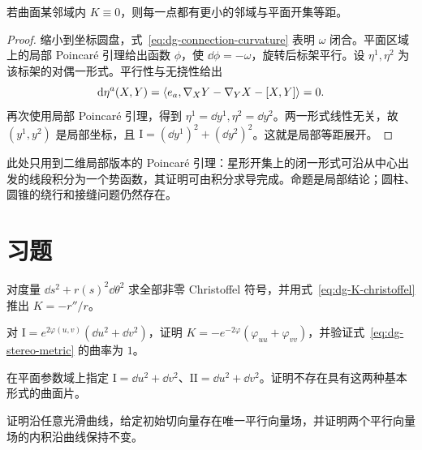 \begin{proposition}[零高斯曲率的局部平面模型]
若曲面某邻域内 $K\equiv0$，则每一点都有更小的邻域与平面开集等距。
\end{proposition}
\begin{proof}
缩小到坐标圆盘，式~\eqref{eq:dg-connection-curvature} 表明 $\omega$ 闭合。平面区域上的局部 Poincar\'e 引理给出函数 $\phi$，使 $\dd\phi=-\omega$，旋转后标架平行。设 $\eta^1,\eta^2$ 为该标架的对偶一形式。平行性与无挠性给出
\[
 \mathop{}\!\mathrm d\eta^a(X,Y)=\langle e_a,\nabla_XY-\nabla_YX-[X,Y]\rangle=0.
\]
再次使用局部 Poincar\'e 引理，得到 $\eta^1=\dd y^1,\eta^2=\dd y^2$。两一形式线性无关，故 $(y^1,y^2)$ 是局部坐标，且 $\mathrm I=(\dd y^1)^2+(\dd y^2)^2$。这就是局部等距展开。
\end{proof}
此处只用到二维局部版本的 Poincar\'e 引理：星形开集上的闭一形式可沿从中心出发的线段积分为一个势函数，其证明可由积分求导完成。命题是局部结论；圆柱、圆锥的绕行和接缝问题仍然存在。

\section{习题}
\begin{exercise}\label{ex:dg-connection-warped}
对度量 $\dd s^2+r(s)^2\dd\theta^2$ 求全部非零 Christoffel 符号，并用式~\eqref{eq:dg-K-christoffel} 推出 $K=-r''/r$。
\end{exercise}
\begin{exercise}\label{ex:dg-connection-conformal}
对 $\mathrm I=e^{2\varphi(u,v)}(\dd u^2+\dd v^2)$，证明 $K=-e^{-2\varphi}(\varphi_{uu}+\varphi_{vv})$，并验证式~\eqref{eq:dg-stereo-metric} 的曲率为 $1$。
\end{exercise}
\begin{exercise}\label{ex:dg-connection-incompatible}
在平面参数域上指定 $\mathrm I=\dd u^2+\dd v^2$、$\mathrm{II}=\dd u^2+\dd v^2$。证明不存在具有这两种基本形式的曲面片。
\end{exercise}
\begin{exercise}\label{ex:dg-connection-parallel}
证明沿任意光滑曲线，给定初始切向量存在唯一平行向量场，并证明两个平行向量场的内积沿曲线保持不变。
\end{exercise}

